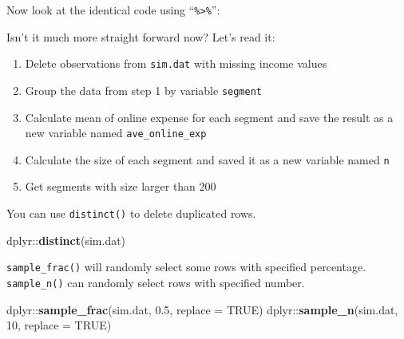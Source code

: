 \documentclass[]{book}
\newenvironment{Shaded}{\begin{snugshade}}{\end{snugshade}}
\newcommand{\KeywordTok}[1]{\textcolor[rgb]{0.13,0.29,0.53}{\textbf{{#1}}}}
\newcommand{\DataTypeTok}[1]{\textcolor[rgb]{0.13,0.29,0.53}{{#1}}}
\newcommand{\DecValTok}[1]{\textcolor[rgb]{0.00,0.00,0.81}{{#1}}}
\newcommand{\FloatTok}[1]{\textcolor[rgb]{0.00,0.00,0.81}{{#1}}}
\newcommand{\StringTok}[1]{\textcolor[rgb]{0.31,0.60,0.02}{{#1}}}
\newcommand{\OtherTok}[1]{\textcolor[rgb]{0.56,0.35,0.01}{{#1}}}
\newcommand{\NormalTok}[1]{{#1}}
\providecommand{\tightlist}{%
  \setlength{\itemsep}{0pt}\setlength{\parskip}{0pt}}
\theoremstyle{definition}
\theoremstyle{definition}
\theoremstyle{remark}
\begin{document}
Now look at the identical code using ``\texttt{\%\textgreater{}\%}'':

\begin{Shaded}
\end{Shaded}

Isn't it much more straight forward now? Let's read it:

\begin{enumerate}
\def\labelenumi{\arabic{enumi}.}
\tightlist
\item
  Delete observations from \texttt{sim.dat} with missing income values
\item
  Group the data from step 1 by variable \texttt{segment}
\item
  Calculate mean of online expense for each segment and save the result
  as a new variable named \texttt{ave\_online\_exp}
\item
  Calculate the size of each segment and saved it as a new variable
  named \texttt{n}
\item
  Get segments with size larger than 200
\end{enumerate}

You can use \texttt{distinct()} to delete duplicated rows.

\begin{Shaded}
\begin{Highlighting}[]
\NormalTok{dplyr::}\KeywordTok{distinct}\NormalTok{(sim.dat)}
\end{Highlighting}
\end{Shaded}

\texttt{sample\_frac()} will randomly select some rows with specified
percentage. \texttt{sample\_n()} can randomly select rows with specified
number.

\begin{Shaded}
\begin{Highlighting}[]
\NormalTok{dplyr::}\KeywordTok{sample_frac}\NormalTok{(sim.dat, }\FloatTok{0.5}\NormalTok{, }\DataTypeTok{replace =} \OtherTok{TRUE}\NormalTok{) }
\NormalTok{dplyr::}\KeywordTok{sample_n}\NormalTok{(sim.dat, }\DecValTok{10}\NormalTok{, }\DataTypeTok{replace =} \OtherTok{TRUE}\NormalTok{) }
\end{Highlighting}
\end{Shaded}
\end{document}
